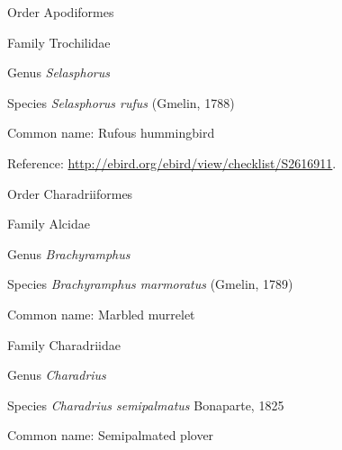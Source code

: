 \documentclass[9pt, article]{memoir}
\begin{document}
\begin{multicols}{2}
\vspace{6pt}\noindent\hspace{18pt}Order Apodiformes


\vspace{6pt}\noindent\hspace{24pt}Family Trochilidae


\vspace{6pt}\noindent\hspace{30pt}Genus \textit{Selasphorus}


\vspace{6pt}\noindent\hspace{36pt}Species \textit{Selasphorus rufus} (Gmelin, 1788)


Common name: Rufous hummingbird

Reference: 
\url{http://ebird.org/ebird/view/checklist/S2616911}.

\vspace{6pt}\noindent\hspace{18pt}Order Charadriiformes


\vspace{6pt}\noindent\hspace{24pt}Family Alcidae


\vspace{6pt}\noindent\hspace{30pt}Genus \textit{Brachyramphus}


\vspace{6pt}\noindent\hspace{36pt}Species \textit{Brachyramphus marmoratus} (Gmelin, 1789)


Common name: Marbled murrelet

\vspace{6pt}\noindent\hspace{24pt}Family Charadriidae


\vspace{6pt}\noindent\hspace{30pt}Genus \textit{Charadrius}


\vspace{6pt}\noindent\hspace{36pt}Species \textit{Charadrius semipalmatus} Bonaparte, 1825


Common name: Semipalmated plover


\end{multicols}
\end{document}
